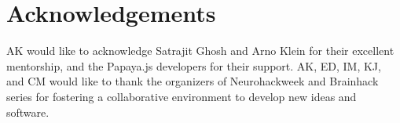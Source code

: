 \section{Acknowledgements}
AK would like to acknowledge Satrajit Ghosh and Arno Klein for their excellent mentorship, and the Papaya.js developers for their support. AK, ED, IM, KJ, and CM would like to thank the organizers of Neurohackweek and Brainhack series for fostering a collaborative environment to develop new ideas and software. 

